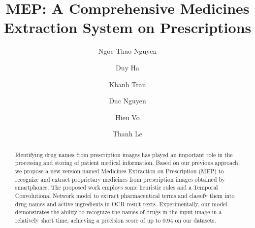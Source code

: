 \documentclass[runningheads]{llncs}
\begin{document}
%
\title{MEP: A Comprehensive Medicines Extraction System on Prescriptions}
%
%
\author{Ngoc-Thao Nguyen \and
    Duy Ha \and
	Khanh Tran \and
	Duc Nguyen \and
	Hieu Vo \and 
	Thanh Le}
%
%
\maketitle
%
\begin{abstract}
Identifying drug names from prescription images has played an important role in the processing and storing of patient medical information. Based on our previous approach, we propose a new version named Medicines Extraction on Prescription (MEP) to recognize and extract proprietary medicines from prescription images obtained by smartphones. The proposed work employs some heuristic rules and a Temporal Convolutional Network model to extract pharmaceutical terms and classify them into drug names and active ingredients in OCR result texts. Experimentally, our model demonstrates the ability to recognize the names of drugs in the input image in a relatively short time, achieving a precision score of up to 0.94 on our datasets.



\end{abstract}
%
%
%
\end{document}
